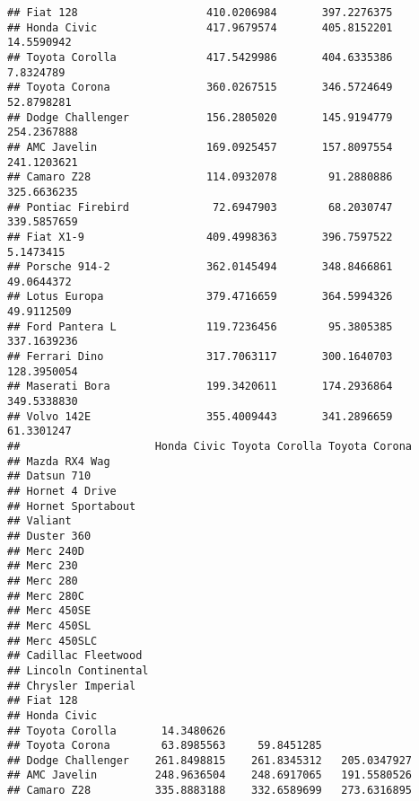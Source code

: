 \documentclass[]{book}
\begin{document}
\begin{verbatim}
## Fiat 128                    410.0206984       397.2276375            
## Honda Civic                 417.9679574       405.8152201  14.5590942
## Toyota Corolla              417.5429986       404.6335386   7.8324789
## Toyota Corona               360.0267515       346.5724649  52.8798281
## Dodge Challenger            156.2805020       145.9194779 254.2367888
## AMC Javelin                 169.0925457       157.8097554 241.1203621
## Camaro Z28                  114.0932078        91.2880886 325.6636235
## Pontiac Firebird             72.6947903        68.2030747 339.5857659
## Fiat X1-9                   409.4998363       396.7597522   5.1473415
## Porsche 914-2               362.0145494       348.8466861  49.0644372
## Lotus Europa                379.4716659       364.5994326  49.9112509
## Ford Pantera L              119.7236456        95.3805385 337.1639236
## Ferrari Dino                317.7063117       300.1640703 128.3950054
## Maserati Bora               199.3420611       174.2936864 349.5338830
## Volvo 142E                  355.4009443       341.2896659  61.3301247
##                     Honda Civic Toyota Corolla Toyota Corona
## Mazda RX4 Wag                                               
## Datsun 710                                                  
## Hornet 4 Drive                                              
## Hornet Sportabout                                           
## Valiant                                                     
## Duster 360                                                  
## Merc 240D                                                   
## Merc 230                                                    
## Merc 280                                                    
## Merc 280C                                                   
## Merc 450SE                                                  
## Merc 450SL                                                  
## Merc 450SLC                                                 
## Cadillac Fleetwood                                          
## Lincoln Continental                                         
## Chrysler Imperial                                           
## Fiat 128                                                    
## Honda Civic                                                 
## Toyota Corolla       14.3480626                             
## Toyota Corona        63.8985563     59.8451285              
## Dodge Challenger    261.8498815    261.8345312   205.0347927
## AMC Javelin         248.9636504    248.6917065   191.5580526
## Camaro Z28          335.8883188    332.6589699   273.6316895

\end{verbatim}
\end{document}
